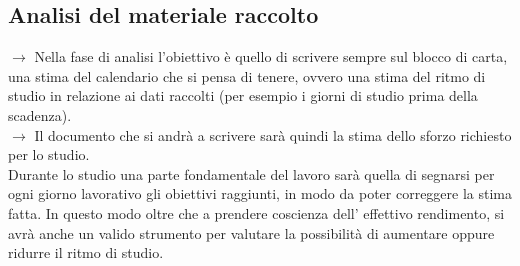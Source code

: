 \documentclass[11pt,a4paper]{article}
\begin{document}
\subsection{Analisi del materiale raccolto}
$\rightarrow$ Nella fase di analisi l'obiettivo è quello di scrivere sempre sul blocco di carta, una stima del calendario che si pensa di tenere, ovvero una stima del ritmo di studio in relazione ai dati raccolti (per esempio i giorni di studio prima della scadenza).\\
$\rightarrow$ Il documento che si andrà a scrivere sarà quindi la stima dello sforzo richiesto per lo studio.\\
Durante lo studio una parte fondamentale del lavoro sarà quella di segnarsi per ogni giorno lavorativo gli obiettivi raggiunti, in modo da poter correggere la stima fatta. In questo modo oltre che a prendere coscienza dell' effettivo rendimento, si avrà anche un valido strumento per valutare la possibilità di aumentare oppure ridurre il ritmo di studio.\\
\end{document}
